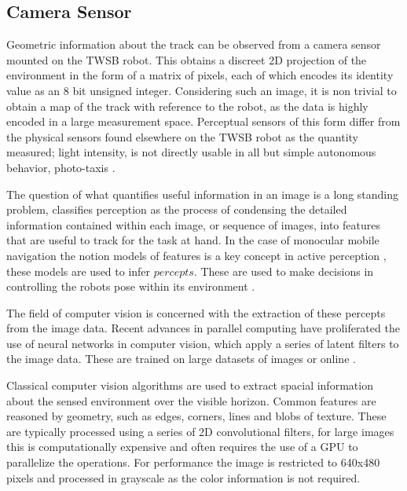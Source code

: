        \subsection{Camera Sensor}
        Geometric information about the track can be observed from a camera sensor mounted on the TWSB robot.
        This obtains a discreet 2D projection of the environment in the form of a matrix of pixels, each of which encodes 
        its identity value as an 8 bit unsigned integer. Considering such an image, it is non trivial to
        obtain a map of the track with reference to the robot, as the data is highly encoded in a large measurement space. 
        Perceptual sensors of this form differ from the physical sensors found elsewhere on the TWSB robot as the quantity measured; 
        light intensity, is not directly usable in all but simple autonomous behavior, photo-taxis \cite{hasslacher1995living}. 
        
        The question of what quantifies useful information in an image is a long standing problem,  \cite{siegwart2011introduction} classifies 
        perception as the process of condensing the detailed information contained within each image, or sequence of images, 
        into features that are useful to track for the task at hand.
        In the case of monocular mobile navigation the notion models of features is a key concept in active perception \cite{Activeperception},
        these models are used to infer $\textit{percepts}$. These are used to make decisions in controlling the robots pose within its environment 
        \cite{hutchinson1996tutorial}. 

        The field of computer vision is concerned with the extraction of these percepts from the image data. 
        Recent advances in parallel computing have proliferated the use of neural networks in computer vision, which apply a 
        series of latent filters to the image data. These are trained on large datasets of images 
        or online \cite{tai2017virtual} \cite{lee2013line} \cite{kober2013reinforcement}. 

        Classical computer vision algorithms are used to extract spacial information about the sensed environment over the visible 
        horizon. Common features are reasoned by geometry, 
        \cite{lee2009geometric} such as edges, corners, lines and blobs of texture. These are typically processed using a series of 2D convolutional filters,
        for large images this is computationally expensive and often requires the use of a GPU to parallelize the operations. For performance the image is restricted 
        to 640x480 pixels and processed in grayscale as the color information is not required.

